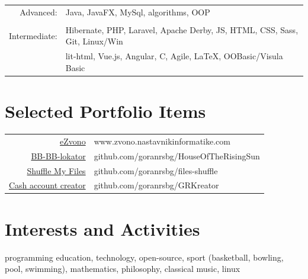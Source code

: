 \documentclass[a4paper,11pt]{article}
\begin{document}
{  \begin{tabular}{r|l}
    Advanced: & Java, JavaFX, MySql, algorithms, OOP\\
     \multicolumn{2}{c}{} \\
    Intermediate:  & Hibernate, PHP, Laravel, Apache Derby, JS,  HTML, CSS, Sass, Git, Linux/Win\\ 
              & lit-html, Vue.js, Angular, C, Agile, {\LaTeX}, OOBasic/Visula Basic\\

  \end{tabular}
  
  \section*{Selected Portfolio Items}
    
    \begin{tabular}{r|l}
    
      \href{http://www.zvono.nastavnikinformatike.com}{\textcolor{links}{eZvono}} & www.zvono.nastavnikinformatike.com\\
      \href{https://github.com/goranrsbg/HouseOfTheRisingSun}{\textcolor{links}{BB-BB-lokator}} & github.com/goranrsbg/HouseOfTheRisingSun\\
      \href{https://github.com/goranrsbg/files-shuffle}{\textcolor{links}{Shuffle My Files}} & github.com/goranrsbg/files-shuffle\\
      \href{https://github.com/goranrsbg/GRKreator}{\textcolor{links}{Cash account creator}} & github.com/goranrsbg/GRKreator\\
    
    \end{tabular}
    
  \section*{Interests and Activities}

   programming education, technology, open-source, sport (basketball, bowling, pool, swimming),
   mathematics, philosophy, classical music, linux
  
}
\end{document}
